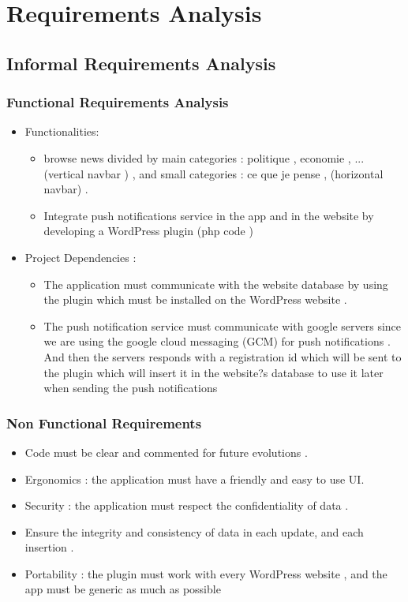 \section{Requirements Analysis}


\subsection{Informal Requirements Analysis}

\subsubsection{Functional Requirements Analysis}

\begin{itemize}
\item Functionalities:

\begin{itemize}
\item browse news divided by main categories : politique ,  economie , ... (vertical navbar ) , and small categories : ce que je pense ,  (horizontal navbar) .
\item Integrate push notifications service in the app and in the website by developing a WordPress  plugin (php code ) 
\end{itemize}

\item Project Dependencies  : 
\begin{itemize}
\item 	The application must communicate with the website database by using the plugin which must be installed on the WordPress website .
\item The push notification service must communicate with  google servers since we are using the google cloud messaging (GCM)  for push notifications . And then the servers responds with a registration id  which will be sent to the plugin which will insert it in the website?s database to use it later when sending the push notifications  
\end{itemize}

\end{itemize}

\subsubsection{Non Functional Requirements}


\begin{itemize}
\item 	Code must be clear and  commented for future evolutions . 
\item 	Ergonomics : the application must  have a friendly and easy to use UI.
\item  Security : the application must respect the confidentiality of data .
\item 	Ensure the integrity and consistency of data in each update, and each insertion .
\item 	Portability : the plugin must work with every WordPress website , and the app must be generic as much as possible 
 
\end{itemize}

